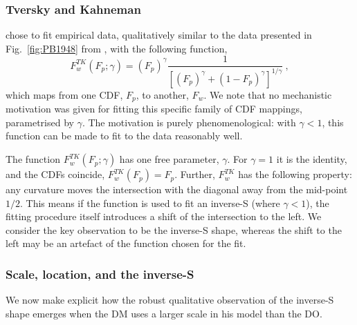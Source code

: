 \documentclass[a4paper, 12pt]{article}
\newcommand{\elabel}[1]{\label{eq:#1}}
\newcommand{\eref}[1]{(Eq.~\ref{eq:#1})}
\newcommand{\fref}[1]{Fig.~\ref{fig:#1}}
\newcommand{\be}{\begin{equation}}
\newcommand{\ee}{\end{equation}}
\begin{document}
\subsubsection{Tversky and Kahneman}
\textcite{TverskyKahneman1992} chose to fit empirical data, qualitatively similar to the data presented in \fref{PB1948} from \textcite{PrestonBaratta1948}, with the following function,
%
\be
\elabel{correspondence}
F^{TK}_w\left(F_p; \gamma\right) = \left(F_p\right)^\gamma \frac{1}{\left[\left(F_p\right)^\gamma+\left(1-F_p\right)^\gamma\right]^{1/\gamma}} ~,
\ee
%
which maps from one CDF, $F_p$, to another, $F_w$. We note that no mechanistic motivation was given for fitting this specific family of CDF mappings, parametrised by $\gamma$. The motivation is purely phenomenological: with $\gamma<1$, this function can be made to fit to the data reasonably well.

The function $F^{TK}_w\left(F_p; \gamma \right)$ has one free parameter, $\gamma$. For $\gamma=1$ it is the identity, and the CDFs coincide, $F^{TK}_w\left(F_p\right)=F_p$. Further, $F^{TK}_w$ has the following property: any curvature moves the intersection with the diagonal away from the mid-point $1/2$. This means if the function is used to fit an inverse-S (where $\gamma<1$), the fitting procedure itself introduces a shift of the intersection to the left. We consider the key observation to be the inverse-S shape, whereas the shift to the left may be an artefact of the function chosen for the fit.

\subsubsection{Scale, location, and the inverse-S}
We now make explicit how the robust qualitative observation of the inverse-S shape emerges when the DM uses a larger scale in his model than the DO.
\end{document}

